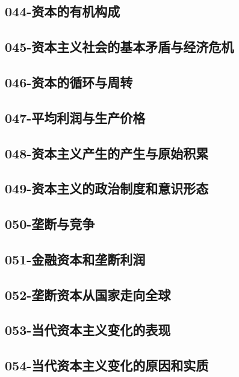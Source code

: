 \subsection{044-资本的有机构成}

\subsection{045-资本主义社会的基本矛盾与经济危机}

\subsection{046-资本的循环与周转}

\subsection{047-平均利润与生产价格}

\subsection{048-资本主义产生的产生与原始积累}

\subsection{049-资本主义的政治制度和意识形态}

\subsection{050-垄断与竞争}

\subsection{051-金融资本和垄断利润}

\subsection{052-垄断资本从国家走向全球}

\subsection{053-当代资本主义变化的表现}

\subsection{054-当代资本主义变化的原因和实质}

